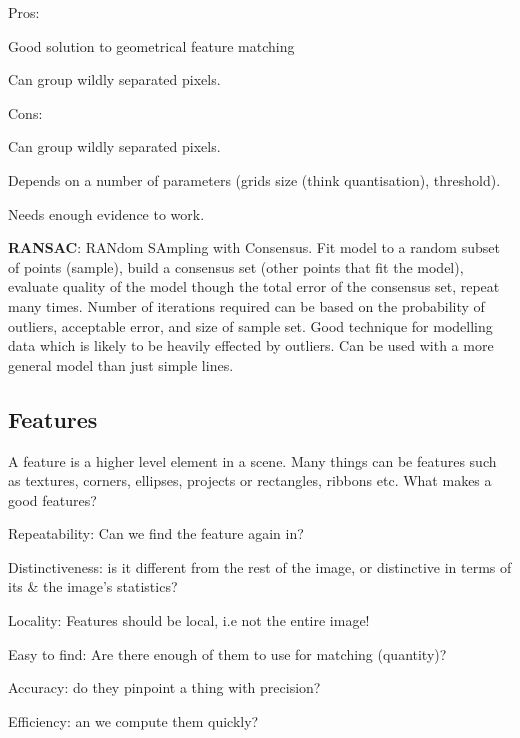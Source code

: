 \documentclass[8pt]{extarticle}
\begin{document}
\begin{multicols}{2}
Pros:
\begin{compactitem}
    \item Good solution to geometrical feature matching
    \item Can group wildly separated pixels.
\end{compactitem}
Cons:
\begin{compactitem}
    \item Can group wildly separated pixels.
    \item Depends on a number of parameters (grids size (think quantisation), threshold).
    \item Needs enough evidence to work.
\end{compactitem}

\textbf{RANSAC}: RANdom SAmpling with Consensus. Fit model to a random subset of points (sample), build a consensus set (other points that fit the model), evaluate quality of the model though the total error of the consensus set, repeat many times. Number of iterations required can be based on the probability of outliers, acceptable error, and size of sample set. Good technique for modelling data which is likely to be heavily effected by outliers. Can be used with a more general model than just simple lines.

\subsection{Features}
A feature is a higher level element in a scene. Many things can be features such as textures, corners, ellipses, projects or rectangles, ribbons etc. What makes a good features?
\begin{compactitem}
    \item Repeatability: Can we find the feature again in?
    \item Distinctiveness: is it different from the rest of the image, or distinctive in terms of its \& the image's statistics?
    \item Locality: Features should be local, i.e not the entire image!
    \item Easy to find: Are there enough of them to use for matching (quantity)?
    \item Accuracy: do they pinpoint a thing with precision?
    \item Efficiency: an we compute them quickly?
\end{compactitem}


\end{multicols}
\end{document}

